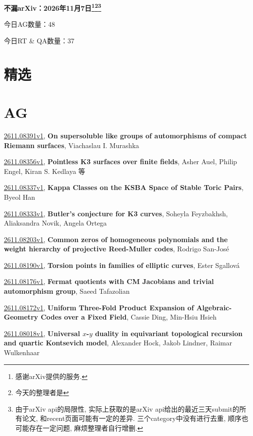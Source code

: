 \documentclass[9pt, a4paper]{article}
\theoremstyle{plain}
\theoremstyle{definition}
\theoremstyle{remark}
\newcommand{\arxiv}[3]{\href{https://arxiv.org/abs/#1}{#1}, \textbf{\textcolor{arxivblue}{#2}}, #3}
\newcommand{\AGnumber}{48}
\newcommand{\RTQAnumber}{37}
\newcommand{\NewestDate}{2026年11月7日}
\newcommand{\todayarXiver}{} %
\begin{document}
\begin{center}
    \Huge\textbf{不漏arXiv：\NewestDate\footnote{感谢arXiv提供的服务.}\footnote{今天的整理者是\todayarXiver}\footnote{由于arXiv api的局限性, 实际上获取的是arXiv api给出的最近三天submit的所有论文, 和recent页面可能有一定的差异. 三个category中没有进行去重, 顺序也可能存在一定问题, 麻烦整理者自行增删.}} \\
\end{center}

\setcounter{section}{-1}

\begin{center}
    今日AG数量：\AGnumber
    
    今日RT \& QA数量：\RTQAnumber
    
\end{center}


\section{精选}


\section{AG}
\arxiv{2611.08391v1}{On supersoluble like groups of automorphisms of compact Riemann surfaces}{Viachaslau I. Murashka}

\arxiv{2611.08356v1}{Pointless K3 surfaces over finite fields}{Asher Auel, Philip Engel, Kiran S. Kedlaya 等}

\arxiv{2611.08337v1}{Kappa Classes on the KSBA Space of Stable Toric Pairs}{Byeol Han}

\arxiv{2611.08333v1}{Butler's conjecture for K3 curves}{Soheyla Feyzbakhsh, Aliaksandra Novik, Angela Ortega}

\arxiv{2611.08203v1}{Common zeros of homogeneous polynomials and the weight hierarchy of projective Reed-Muller codes}{Rodrigo San-José}

\arxiv{2611.08190v1}{Torsion points in families of elliptic curves}{Ester Sgallová}

\arxiv{2611.08176v1}{Fermat quotients with CM Jacobians and trivial automorphism group}{Saeed Tafazolian}

\arxiv{2611.08172v1}{Uniform Three-Fold Product Expansion of Algebraic-Geometry Codes over a Fixed Field}{Cassie Ding, Min-Hsiu Hsieh}

\arxiv{2611.08018v1}{Universal $x$-$y$ duality in equivariant topological recursion and quartic Kontsevich model}{Alexander Hock, Jakob Lindner, Raimar Wulkenhaar}
\end{document}
